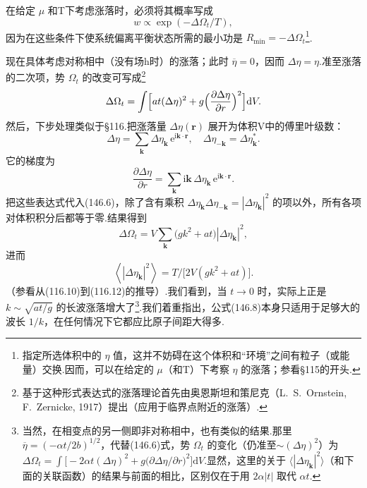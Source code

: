 在给定 $\mu$ 和T下考虑涨落时，必须将其概率写成
\begin{equation*}
  w\propto\exp(-\Delta\Omega_t/T),
\end{equation*}
因为在这些条件下使系统偏离平衡状态所需的最小功是 $R_{\min}=-\Delta\Omega_t$\footnote{指定所选体积中的 $\eta$ 值，这并不妨碍在这个体积和“环境”之间有粒子（或能量）交换.因而，可以在给定的 $\mu$（和T）下考察 $\eta$ 的涨落；参看§115的开头.}.

现在具体考虑对称相中（没有场h时）的涨落；此时 $\overline{\eta}=0$，因而 $\Delta\eta=\eta$.准至涨落的二次项，势 $\Omega_t$ 的改变可写成\footnote{基于这种形式表达式的涨落理论首先由奥恩斯坦和策尼克（L.~S.~Ornstein, F.~Zernicke, 1917）提出（应用于临界点附近的涨落）.}
\begin{equation}
  \Delta\Omega_t=\int\Bigl[at(\Delta\eta)^2
  +g\Bigl(\frac{\partial\Delta\eta}{\partial r}\Bigr)^2\Bigr]\mathrm{d}V.
\end{equation}
然后，下步处理类似于§116.把涨落量 $\Delta\eta(\boldsymbol{r})$ 展开为体积V中的傅里叶级数：
\begin{equation}
  \Delta\eta=\sum_{\boldsymbol{k}}\Delta\eta_{\boldsymbol{k}}\,
  \mathrm{e}^{\mathrm{i}\boldsymbol{k}\cdot\boldsymbol{r}},\quad
  \Delta\eta_{-\boldsymbol{k}}=\Delta\eta_{\boldsymbol{k}}^{*}.
\end{equation}
它的梯度为
\begin{equation*}
  \frac{\partial\Delta\eta}{\partial r}
  =\sum_{\boldsymbol{k}}\mathrm{i}\boldsymbol{k}\,
  \Delta\eta_{\boldsymbol{k}}\,\mathrm{e}^{\mathrm{i}\boldsymbol{k}\cdot\boldsymbol{r}}.
\end{equation*}
把这些表达式代入(146.6)，除了含有乘积 $\Delta\eta_{\boldsymbol{k}}\Delta\eta_{-\boldsymbol{k}}=|\Delta\eta_{\boldsymbol{k}}|^2$ 的项以外，所有各项对体积积分后都等于零.结果得到
\begin{equation*}
  \Delta\Omega_t=V\sum_{\boldsymbol{k}}\bigl(gk^2+at\bigr)
  \left|\Delta\eta_{\boldsymbol{k}}\right|^2,
\end{equation*}
进而
\begin{equation}
  \left\langle\left|\Delta\eta_{\boldsymbol{k}}\right|^2\right\rangle
  =T/\bigl[2V(gk^2+at)\bigr].
\end{equation}
（参看从(116.10)到(116.12)的推导）.我们看到，当 $t\to0$ 时，实际上正是 $k\sim\sqrt{at/g}$ 的长波涨落增大了\footnote{当然，在相变点的另一侧即非对称相中，也有类似的结果.那里 $\overline{\eta}=(-\alpha t/2b)^{1/2}$，代替(146.6)式，势 $\Omega_t$ 的变化（仍准至$\sim(\Delta\eta)^2$）为 $\Delta\Omega_t=\int\bigl[-2\alpha t(\Delta\eta)^2+g\bigl(\partial\Delta\eta/\partial r\bigr)^2\bigr]\mathrm{d}V$.显然，这里的关于 $\langle|\Delta\eta_{\boldsymbol{k}}|^2\rangle$（和下面的关联函数）的结果与前面的相比，区别仅在于用 $2\alpha|t|$ 取代 $\alpha t$.}.我们着重指出，公式(146.8)本身只适用于足够大的波长 $1/k$，在任何情况下它都应比原子间距大得多.

